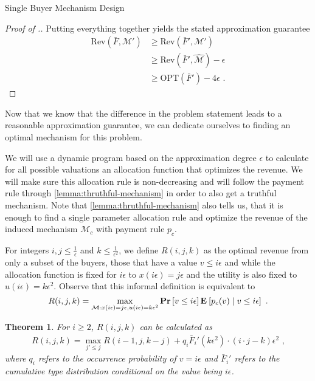 \documentclass[11pt,a4paper]{article}
\newtheorem{theorem}{Theorem}
\renewcommand{\Pr}[1]{\mbox{\rm\bf Pr}\left[#1\right]}
\newcommand{\Ex}[2][]{\mbox{\rm\bf E}_{#1}\left[#2\right]}
\newcommand{\1}[1]{\mbox{\rm\bf 1}_{#1}}
\newcommand{\eqdot}{\text{ .}}
\newcommand{\eqcomma}{\text{ ,}}
\begin{document}
\begin{section}{Single Buyer Mechanism Design}
\begin{proof}[Proof of .]
     Putting everything together yields the stated approximation guarantee
     \begin{align*}
         \mathrm{Rev}(\bar{F}, \mathcal{M}') & \geq \mathrm{Rev}(\bar{F}', \mathcal{M}')                     \\
                                             & \geq \mathrm{Rev}(\bar{F}', \widehat{\mathcal{M}}) - \epsilon \\
                                             & \geq \mathrm{OPT}(\bar{F}') - 4\epsilon \eqdot
     \end{align*}
 \end{proof}

 Now that we know that the difference in the problem statement leads to a reasonable approximation guarantee,
 we can dedicate ourselves to finding an optimal mechanism for this problem.

 We will use a dynamic program based on the approximation degree $\epsilon$ to calculate for all possible valuations
 an allocation function that optimizes the revenue.
 We will make sure this allocation rule is non-decreasing and will follow the payment rule through \cref{lemma:thruthful-mechanism}
 in order to also get a truthful mechanism.
 Note that \cref{lemma:thruthful-mechanism} also tells us, that it is enough to find a single parameter allocation rule and optimize the revenue of the induced mechanism $\mathcal{M}_c$ with payment rule $p_c$.

 For integers $i,j \leq \frac{1}{\epsilon}$ and $k \leq \frac{1}{\epsilon^2}$,
 we define $R(i,j,k)$ as the optimal revenue from only a subset of the buyers, those that have a value $v \leq i \epsilon$
 and while the allocation function is fixed for $i\epsilon$ to $x(i \epsilon) = j \epsilon$ and the utility is also fixed to $u(i \epsilon) = k \epsilon^2$.
 Observe that this informal definition is equivalent to
 \begin{equation}
     \label{eq:rijk}
     R(i,j,k) = \max_{\mathcal{M}: x(i\epsilon) = j\epsilon, u(i\epsilon) = k \epsilon^2} \Pr{v \leq i\epsilon}\Ex{p_c(v)\mid v \leq i \epsilon} \eqdot
 \end{equation}

 \begin{theorem}
     \label{theorem:recursion-formular}
     For $i \geq 2$, $R(i,j,k)$ can be calculated as
     \begin{align*}
         R(i,j,k) = \max_{j' \leq j} R(i-1, j, k - j) + q_i \bar{F}_i'(k \epsilon^2) \cdot (i\cdot j - k)\epsilon^2 \eqcomma
     \end{align*}
     where $q_i$ refers to the occurrence probability of $v = i \epsilon$ and $\bar{F}_i'$ refers to the cumulative type distribution conditional on the value being $i\epsilon$.
 \end{theorem}


\end{section}
\end{document}
